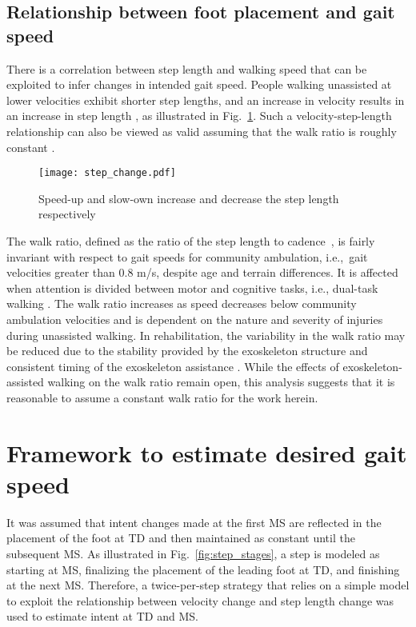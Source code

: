 \subsection{Relationship between foot placement and gait speed }
There is a correlation between step length and walking speed that can be exploited to infer changes in intended gait speed. People walking unassisted at lower velocities exhibit shorter step lengths, and an increase in velocity results in an increase in step length \cite{kuo2001simple,andriacchi1977walking}, as illustrated in Fig.~\ref{fig:step_change}. Such a velocity-step-length relationship can also be viewed as valid assuming that the walk ratio is roughly constant \cite{sekiya1997optimal}. 
%
\begin{figure}
	\centering
	\texttt{[image: step\_change.pdf]}
	\caption{Speed-up and slow-own increase and decrease the step length respectively}\label{fig:step_change}
\end{figure}
%
The walk ratio, defined as the ratio of the step length to cadence~\cite{rota2011walk}, is fairly invariant with respect to gait speeds for community ambulation, i.e.,~gait velocities greater than 0.8 m/s, despite age and terrain differences. It is affected when attention is divided between motor and cognitive tasks, i.e., dual-task walking \cite{bogen2018walk}. The walk ratio increases as speed decreases below community ambulation velocities \cite{murakami2017estimated} and is dependent on the nature and severity of injuries \cite{rota2011walk} during unassisted walking. In rehabilitation, the variability in the walk ratio may be reduced due to the stability provided by the exoskeleton structure and consistent timing of the exoskeleton assistance \cite{seo2015new}. While the effects of exoskeleton-assisted walking on the walk ratio remain open, this analysis suggests that it is reasonable to assume a constant walk ratio for the work herein.

\section{Framework to estimate desired gait speed}\label{sec:BKF}

It was assumed that intent changes made at the first MS are reflected in the placement of the foot at TD and then maintained as constant until the subsequent MS. As illustrated in Fig.~\ref{fig:step_stages}, a step is modeled as starting at MS, finalizing the placement of the leading foot at TD, and finishing at the next MS. Therefore, a twice-per-step strategy that relies on a simple model to exploit the relationship between velocity change and step length change was used to estimate intent at TD and MS. 

